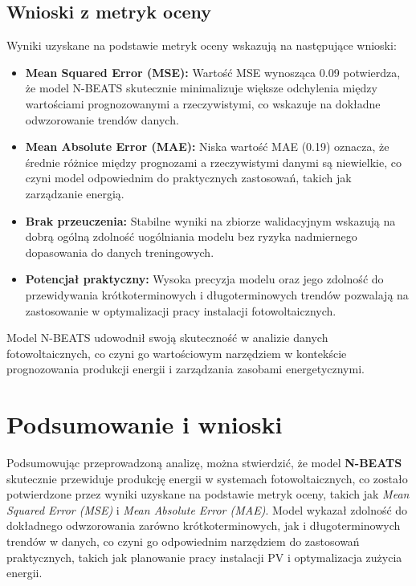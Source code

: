\documentclass[a4paper,fleqn,final]{cas-dc}\usepackage[authoryear,longnamesfirst]{natbib}
\begin{document}
\subsection{Wnioski z metryk oceny}
Wyniki uzyskane na podstawie metryk oceny wskazują na następujące wnioski:
\begin{itemize}
    \item \textbf{Mean Squared Error (MSE):} Wartość MSE wynosząca 0.09 potwierdza, że model N-BEATS skutecznie minimalizuje większe odchylenia między wartościami prognozowanymi a rzeczywistymi, co wskazuje na dokładne odwzorowanie trendów danych.
    \item \textbf{Mean Absolute Error (MAE):} Niska wartość MAE (0.19) oznacza, że średnie różnice między prognozami a rzeczywistymi danymi są niewielkie, co czyni model odpowiednim do praktycznych zastosowań, takich jak zarządzanie energią.
    \item \textbf{Brak przeuczenia:} Stabilne wyniki na zbiorze walidacyjnym wskazują na dobrą ogólną zdolność uogólniania modelu bez ryzyka nadmiernego dopasowania do danych treningowych.
    \item \textbf{Potencjał praktyczny:} Wysoka precyzja modelu oraz jego zdolność do przewidywania krótkoterminowych i długoterminowych trendów pozwalają na zastosowanie w optymalizacji pracy instalacji fotowoltaicznych.
\end{itemize}

Model N-BEATS udowodnił swoją skuteczność w analizie danych fotowoltaicznych, co czyni go wartościowym narzędziem w kontekście prognozowania produkcji energii i zarządzania zasobami energetycznymi.

\section{Podsumowanie i wnioski}

Podsumowując przeprowadzoną analizę, można stwierdzić, że model \textbf{N-BEATS} skutecznie przewiduje produkcję energii w systemach fotowoltaicznych, co zostało potwierdzone przez wyniki uzyskane na podstawie metryk oceny, takich jak \textit{Mean Squared Error (MSE)} i \textit{Mean Absolute Error (MAE)}. Model wykazał zdolność do dokładnego odwzorowania zarówno krótkoterminowych, jak i długoterminowych trendów w danych, co czyni go odpowiednim narzędziem do zastosowań praktycznych, takich jak planowanie pracy instalacji PV i optymalizacja zużycia energii.
\end{document}
